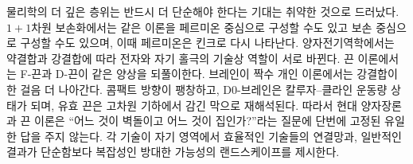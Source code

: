 물리학의 더 깊은 층위는 반드시 더 단순해야 한다는 기대는 취약한 것으로 드러났다. \(1+1\)차원 보손화에서는 같은 이론을 페르미온 중심으로 구성할 수도 있고 보손 중심으로 구성할 수도 있으며, 이때 페르미온은 킨크로 다시 나타난다. 양자전기역학에서는 약결합과 강결합에 따라 전자와 자기 홀극의 기술상 역할이 서로 바뀐다. 끈 이론에서는 F-끈과 D-끈이 같은 양상을 되풀이한다. 브레인이 짝수 개인 이론에서는 강결합이 한 걸음 더 나아간다. 콤팩트 방향이 팽창하고, D0-브레인은 칼루자--클라인 운동량 상태가 되며, 유효 끈은 고차원 기하에서 감긴 막으로 재해석된다. 따라서 현대 양자장론과 끈 이론은 ``어느 것이 벽돌이고 어느 것이 집인가?''라는 질문에 단번에 고정된 유일한 답을 주지 않는다. 각 기술이 자기 영역에서 효율적인 기술들의 연결망과, 일반적인 결과가 단순함보다 복잡성인 방대한 가능성의 랜드스케이프를 제시한다.
